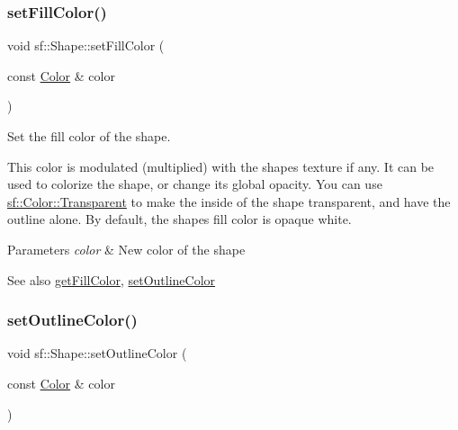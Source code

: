 \subsubsection{\texorpdfstring{setFillColor()}{setFillColor()}}
{\footnotesize\ttfamily void sf\+::\+Shape\+::set\+Fill\+Color (\begin{DoxyParamCaption}\item[{const \mbox{\hyperlink{classsf_1_1_color}{Color}} \&}]{color }\end{DoxyParamCaption})}



Set the fill color of the shape. 

This color is modulated (multiplied) with the shape\textquotesingle{}s texture if any. It can be used to colorize the shape, or change its global opacity. You can use \mbox{\hyperlink{classsf_1_1_color_a569b45471737f770656f50ae7bbac292}{sf\+::\+Color\+::\+Transparent}} to make the inside of the shape transparent, and have the outline alone. By default, the shape\textquotesingle{}s fill color is opaque white.


\begin{DoxyParams}{Parameters}
{\em color} & New color of the shape\\
\hline
\end{DoxyParams}
\begin{DoxySeeAlso}{See also}
\mbox{\hyperlink{classsf_1_1_shape_ae3030128824e687f259d18addcf33528}{get\+Fill\+Color}}, \mbox{\hyperlink{classsf_1_1_shape_a5978f41ee349ac3c52942996dcb184f7}{set\+Outline\+Color}} \begin{DoxyVerb}\end{DoxyVerb}
 
\end{DoxySeeAlso}
\mbox{\label{classsf_1_1_shape_a5978f41ee349ac3c52942996dcb184f7}} 
\subsubsection{\texorpdfstring{setOutlineColor()}{setOutlineColor()}}
{\footnotesize\ttfamily void sf\+::\+Shape\+::set\+Outline\+Color (\begin{DoxyParamCaption}\item[{const \mbox{\hyperlink{classsf_1_1_color}{Color}} \&}]{color }\end{DoxyParamCaption})}



